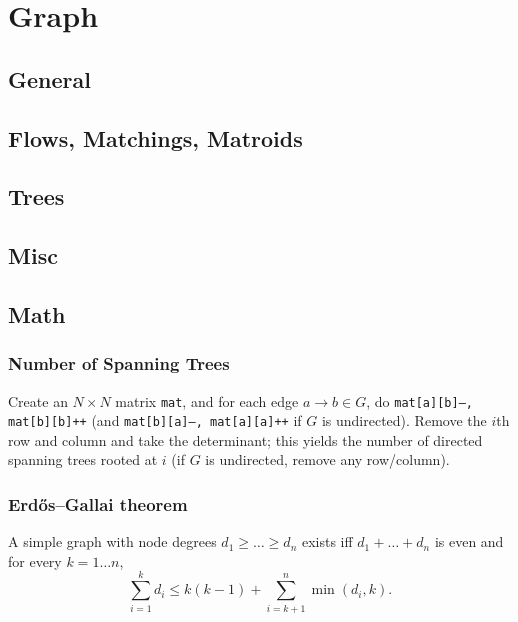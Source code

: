 \chapter{Graph}

\section{General}

\section{Flows, Matchings, Matroids}

\section{Trees}

\section{Misc}

\section{Math}
	\subsection{Number of Spanning Trees}
		Create an $N\times N$ matrix \texttt{mat}, and for each edge $a \rightarrow b \in G$, do
		\texttt{mat[a][b]--, mat[b][b]++} (and \texttt{mat[b][a]--, mat[a][a]++} if $G$ is undirected).
		Remove the $i$th row and column and take the determinant; this yields the number of directed spanning trees rooted at $i$
		(if $G$ is undirected, remove any row/column).

	\subsection{Erdős–Gallai theorem}
		A simple graph with node degrees $d_1 \ge \dots \ge d_n$ exists iff $d_1 + \dots + d_n$ is even and for every $k = 1\dots n$,
		\[ \sum _{i=1}^{k}d_{i}\leq k(k-1)+\sum _{i=k+1}^{n}\min(d_{i},k). \]
